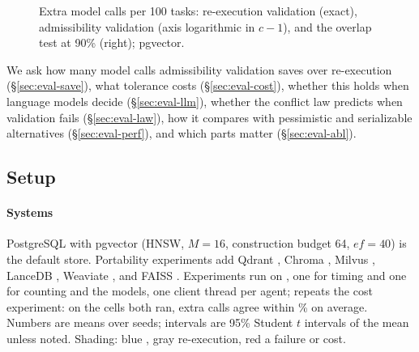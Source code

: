 \documentclass[sigconf, nonacm, review]{acmart}
\begin{document}
\begin{figure}[t]
\centering
{}
\caption{Extra model calls per 100 tasks: re-execution validation
  (exact), admissibility validation (axis logarithmic in $c-1$), and the
  overlap test at 90\% (right); pgvector.}
\label{fig:calls}
\end{figure}

We ask how many model calls admissibility validation saves over
re-execution (\S\ref{sec:eval-save}), what tolerance costs
(\S\ref{sec:eval-cost}), whether this holds when language models
decide (\S\ref{sec:eval-llm}), whether the conflict law predicts when
validation fails (\S\ref{sec:eval-law}), how it compares with
pessimistic and serializable alternatives (\S\ref{sec:eval-perf}), and
which parts matter (\S\ref{sec:eval-abl}).

\subsection{Setup}
\label{sec:eval-setup}

\paragraph{Systems}
PostgreSQL  with pgvector 
(HNSW, $M=16$, construction budget 64,
$\mathit{ef}=40$) \cite{pgvector,postgres} is the default store. Portability
experiments add Qdrant \cite{qdrant}, Chroma \cite{chroma}, Milvus
\cite{milvuslite,DBLP:conf/sigmod/WangYGJXLWGLXYYZLCLZMGJWX21}, LanceDB \cite{lancedb}, Weaviate \cite{weaviate}, and FAISS
\cite{DBLP:journals/tbd/DouzeGDJSMLHJ26}. Experiments run on
, one
for timing and one for counting and the models, one
client thread per agent;  repeats the cost experiment: on the cells both ran,
extra calls agree within \% on average. Numbers are means over seeds; intervals are 95\% Student $t$ intervals of the mean unless noted. Shading: blue \sys{}, gray re-execution, red a failure or cost.
\end{document}
